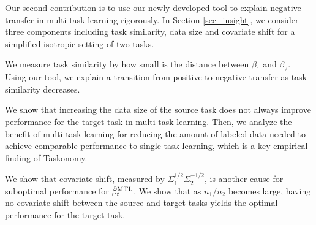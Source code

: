 Our second contribution is to use our newly developed tool to explain negative transfer in multi-task learning rigorously.
In Section \ref{sec_insight}, we consider three components including task similarity, data size and covariate shift for a simplified isotropic setting of two tasks.
\squishlist
		\item We measure task similarity by how small is the distance between $\beta_1$ and $\beta_2$.
		Using our tool, we explain a transition from positive to negative transfer as task similarity decreases.
		\item We show that increasing the data size of the source task does not always improve performance for the target task in multi-task learning.
	Then, we analyze the benefit of multi-task learning for reducing the amount of labeled data needed to achieve comparable performance to single-task learning, which is a key empirical finding of Taskonomy.
		\item We show that covariate shift, measured by $\Sigma_1^{1/2}\Sigma_2^{-1/2}$, is another cause for suboptimal performance for $\hat{\beta}_t^{\text{MTL}}$.
		We show that as $n_1 / n_2$ becomes large, having no covariate shift between the source and target tasks yields the optimal performance for the target task.
\squishend

